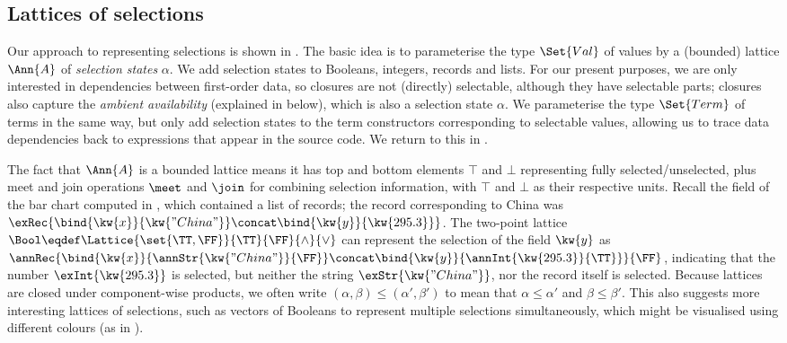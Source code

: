 \subsection{Lattices of selections}
\label{sec:data-dependencies:lattices-of-selections}

Our approach to representing selections is shown in . The basic idea is to parameterise the type $\Set{Val}$ of values by a (bounded) lattice $\Ann{A}$ of \emph{selection states} $\alpha$. We add selection states to Booleans, integers, records and lists. For our present purposes, we are only interested in dependencies between first-order data, so closures are not (directly) selectable, although they have selectable parts; closures also capture the \emph{ambient availability} (explained in  below), which is also a selection state $\alpha$. We parameterise the type $\Set{Term}$ of terms in the same way, but only add selection states to the term constructors corresponding to selectable values, allowing us to trace data dependencies back to expressions that appear in the source code. We return to this in .



The fact that $\Ann{A}$ is a bounded lattice means it has top and bottom elements $\top$ and $\bot$ representing fully selected/unselected, plus meet and join operations $\meet$ and $\join$ for combining selection information, with $\top$ and $\bot$ as their respective units. Recall the  field of the bar chart computed in , which contained a list of records; the record corresponding to China was $\exRec{\bind{\kw{x}}{\kw{"China"}} \concat \bind{\kw{y}}{\kw{295.3}}}$.
The two-point lattice $\Bool \eqdef \Lattice{\set{\TT,\FF}}{\TT}{\FF}{\wedge}{\vee}$ can represent the selection of the field $\kw{y}$ as $\annRec{\bind{\kw{x}}{\annStr{\kw{"China"}}{\FF}} \concat \bind{\kw{y}}{\annInt{\kw{295.3}}{\TT}}}{\FF}$, indicating that the number $\exInt{\kw{295.3}}$ is selected, but neither the string $\exStr{\kw{"China"}}$, nor the record itself is selected. Because lattices are closed under component-wise products, we often write $(\alpha, \beta) \leq (\alpha', \beta')$ to mean that $\alpha \leq \alpha'$ and $\beta \leq \beta'$. This also suggests more interesting lattices of selections, such as vectors of Booleans to represent multiple selections simultaneously, which might be visualised using different colours (as in ).

